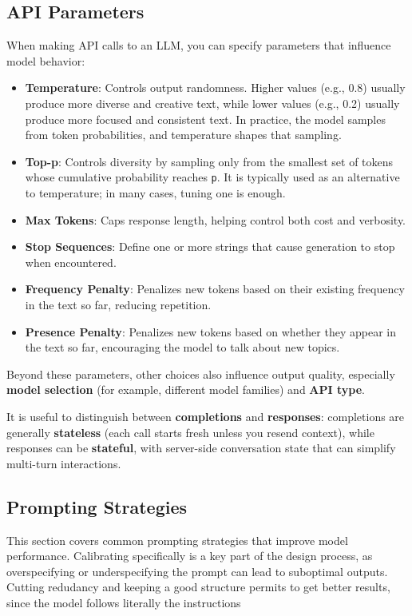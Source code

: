 \subsection{API Parameters}
When making API calls to an LLM, you can specify parameters that influence model behavior:
\begin{itemize}
    \item \textbf{Temperature}: Controls output randomness. Higher values (e.g., 0.8) usually produce more diverse and creative text, while lower values (e.g., 0.2) usually produce more focused and consistent text. In practice, the model samples from token probabilities, and temperature shapes that sampling.
    \item \textbf{Top-p}: Controls diversity by sampling only from the smallest set of tokens whose cumulative probability reaches \texttt{p}. It is typically used as an alternative to temperature; in many cases, tuning one is enough.
    \item \textbf{Max Tokens}: Caps response length, helping control both cost and verbosity.
    \item \textbf{Stop Sequences}: Define one or more strings that cause generation to stop when encountered.
    \item \textbf{Frequency Penalty}: Penalizes new tokens based on their existing frequency in the text so far, reducing repetition.
    \item \textbf{Presence Penalty}: Penalizes new tokens based on whether they appear in the text so far, encouraging the model to talk about new topics.
\end{itemize}

Beyond these parameters, other choices also influence output quality, especially \textbf{model selection} (for example, different model families) and \textbf{API type}.

It is useful to distinguish between \textbf{completions} and \textbf{responses}: completions are generally \textbf{stateless} (each call starts fresh unless you resend context), while responses can be \textbf{stateful}, with server-side conversation state that can simplify multi-turn interactions.

\subsection{Prompting Strategies}
This section covers common prompting strategies that improve model performance.
Calibrating specifically is a key part of the design process, as overspecifying or underspecifying the prompt can lead to suboptimal outputs.
Cutting redudancy and keeping a good structure permits to get better results, since the model follows literally the instructions 

